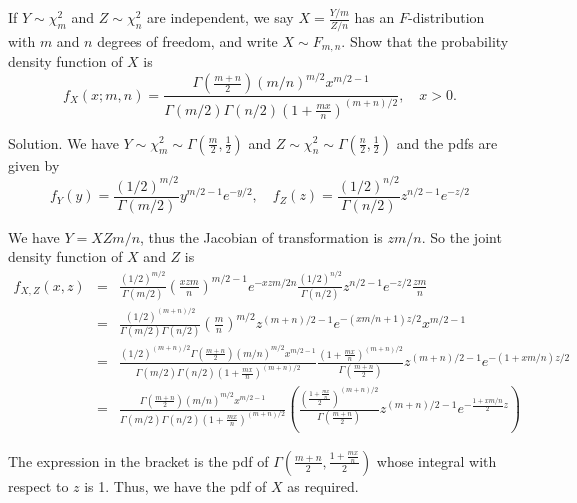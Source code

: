 \item If $Y\sim \chi^2_m$ and $Z\sim\chi^2_n$ are independent, we say $X=\frac{Y/m}{Z/n}$ has an $F$-distribution with $m$ and $n$ degrees of freedom, and write $X\sim F_{m,n}$. Show that the probability density function of $X$ is
\begin{equation}
f_X(x;m,n) = \frac{\Gamma\left(\frac{m+n}{2}\right)(m/n)^{m/2}x^{m/2-1}}{\Gamma(m/2)\Gamma(n/2)\left(1+\frac{mx}{n}\right)^{(m+n)/2}}, \quad x>0.
\end{equation}



Solution. We have $Y\sim \chi^2_m \sim \Gamma\left(\frac{m}{2},\frac{1}{2}\right)$ and $Z\sim\chi^2_n\sim \Gamma\left(\frac{n}{2},\frac{1}{2}\right)$ and the pdfs are given by
\begin{equation}
f_Y(y) = \frac{(1/2)^{m/2}}{\Gamma(m/2)}y^{m/2-1}e^{-y/2},\quad f_Z(z) = \frac{(1/2)^{n/2}}{\Gamma(n/2)}z^{n/2-1}e^{-z/2}
\end{equation}

We have $Y=XZm/n$, thus the Jacobian of transformation is $zm/n$. So the joint density function of $X$ and $Z$ is
\begin{eqnarray}
f_{X,Z}(x,z) & = & \frac{(1/2)^{m/2}}{\Gamma(m/2)}\left(\frac{xzm}{n}\right)^{m/2-1}e^{-xzm/2n} \frac{(1/2)^{n/2}}{\Gamma(n/2)}z^{n/2-1}e^{-z/2} \frac{zm}{n}\nonumber\\
& = & \frac{(1/2)^{(m+n)/2}}{\Gamma(m/2)\Gamma(n/2)}\left(\frac{m}{n}\right)^{m/2}z^{(m+n)/2-1}e^{-(xm/n+1)z/2} x^{m/2-1} \nonumber\\
& = & \frac{(1/2)^{(m+n)/2}\Gamma\left(\frac{m+n}{2}\right)\left(m/n\right)^{m/2}x^{m/2-1} }{\Gamma(m/2)\Gamma(n/2)\left(1+\frac{mx}{n}\right)^{(m+n)/2}} \frac{\left(1+\frac{mx}{n}\right)^{(m+n)/2}}{\Gamma\left(\frac{m+n}{2}\right)}z^{(m+n)/2-1}e^{-(1+xm/n)z/2} \nonumber\\
& = & \frac{\Gamma\left(\frac{m+n}{2}\right)\left(m/n\right)^{m/2}x^{m/2-1} }{\Gamma(m/2)\Gamma(n/2)\left(1+\frac{mx}{n}\right)^{(m+n)/2}} \left(\frac{\left(\frac{1+\frac{mx}{n}}{2}\right)^{(m+n)/2}}{\Gamma\left(\frac{m+n}{2}\right)}z^{(m+n)/2-1}e^{-\frac{1+xm/n}{2}z}\right)
\end{eqnarray}

The expression in the bracket is the pdf of $\Gamma\left(\frac{m+n}{2},\frac{1+\frac{mx}{n}}{2}\right)$ whose integral with respect to $z$ is 1. Thus, we have the pdf of $X$ as required.





